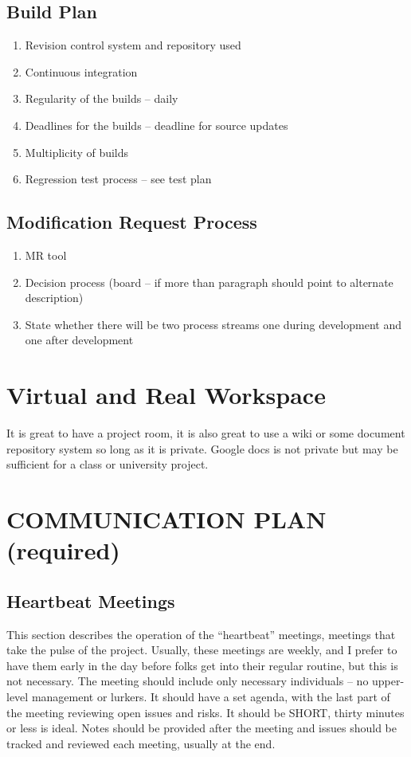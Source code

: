 \subsection{Build Plan} 
\begin{enumerate}
\item Revision control system and repository used
\item Continuous integration 
\item Regularity of the builds – daily 
\item Deadlines for the builds – deadline for source updates 
\item Multiplicity of builds 
\item Regression test process – see test plan 
\end{enumerate}

\subsection{Modification Request Process} 
\begin{enumerate}
\item MR tool 
\item Decision process (board – if more than paragraph should point to alternate description) 
\item State whether there will be two process streams one during development and one after development 
\end{enumerate}

\section{Virtual and Real Workspace}
It is great to have a project room, it is also great to use a wiki or some document repository system so long as it is private.  Google docs is not private but may be sufficient for a class or university project.

\section{COMMUNICATION PLAN (required)}

\subsection{Heartbeat Meetings}
This section describes the operation of the “heartbeat” meetings, meetings that take the pulse of the project.  Usually, these meetings are weekly, and I prefer to have them early in the day before folks get into their regular routine, but this is not necessary.  The meeting should include only necessary individuals – no upper-level management or lurkers.  It should have a set agenda, with the last part of the meeting reviewing open issues and risks.  It should be SHORT, thirty minutes or less is ideal.  Notes should be provided after the meeting and issues should be tracked and reviewed each meeting, usually at the end.

